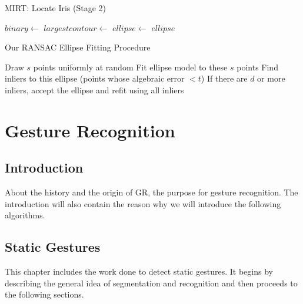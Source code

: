 \documentclass[12pt,fleqn]{book} %
\begin{document}
\begin{algorithm}[h]
\begin{dBox}
	\caption{MIRT: Locate Iris (Stage 2)} \label{mirt_iris_algo}
	\begin{algorithmic}[1]
		\State $binary \gets$ 
		\State {}
		\State {}
		\State $largestcontour \gets$ 
		\State $ellipse \gets$ 
		\Return $ellipse$
		\EndProcedure	
	\end{algorithmic}
\end{dBox}	
\end{algorithm}


\begin{algorithm}
\begin{dBox}
	\caption{Our RANSAC Ellipse Fitting Procedure} \label{our_ransac}
	\begin{algorithmic}[1]
			\State Draw $s$ points uniformly at random
			\State Fit ellipse model to these $s$ points
			\State Find inliers to this ellipse (points whose algebraic error $ < t$)
			\State If there are $d$ or more inliers, accept the ellipse and refit using all inliers	
		\EndWhile	
		\EndProcedure	
	\end{algorithmic}
\end{dBox}	
\end{algorithm}

\chapter{Gesture Recognition}
\section{Introduction}
About the history and the origin of GR, the purpose for gesture recognition. The 
introduction will also contain the reason why we will introduce the following algorithms.\bigskip


\section{Static Gestures}
This chapter includes the work done to detect static gestures. It begins by describing the general idea of segmentation and recognition and then proceeds to the following sections.\bigskip
\end{document}
